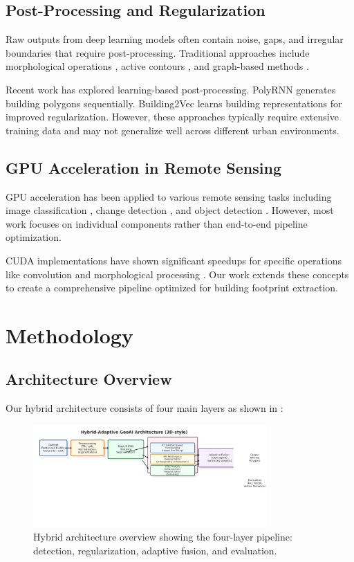\documentclass{article}
\begin{document}
\subsection{Post-Processing and Regularization}

Raw outputs from deep learning models often contain noise, gaps, and irregular boundaries that require post-processing. Traditional approaches include morphological operations \cite{soille2003morphological}, active contours \cite{kass1988snakes}, and graph-based methods \cite{felzenszwalb2004efficient}.

Recent work has explored learning-based post-processing. PolyRNN \cite{castrejon2017annotating} generates building polygons sequentially. Building2Vec \cite{zorzi2019machine} learns building representations for improved regularization. However, these approaches typically require extensive training data and may not generalize well across different urban environments.

\subsection{GPU Acceleration in Remote Sensing}

GPU acceleration has been applied to various remote sensing tasks including image classification \cite{plaza2011recent}, change detection \cite{prendes2015new}, and object detection \cite{ammour2017deep}. However, most work focuses on individual components rather than end-to-end pipeline optimization.

CUDA implementations have shown significant speedups for specific operations like convolution \cite{chetlur2014cudnn} and morphological processing \cite{van2011morphological}. Our work extends these concepts to create a comprehensive pipeline optimized for building footprint extraction.

\section{Methodology}

\subsection{Architecture Overview}

Our hybrid architecture consists of four main layers as shown in :

\begin{figure}[tb]
\centering
\includegraphics[width=0.8\textwidth]{Hybrid-Adaptive-Architecture.png}
\caption{Hybrid architecture overview showing the four-layer pipeline: detection, regularization, adaptive fusion, and evaluation.}
\label{fig:architecture}
\end{figure}
\end{document}
